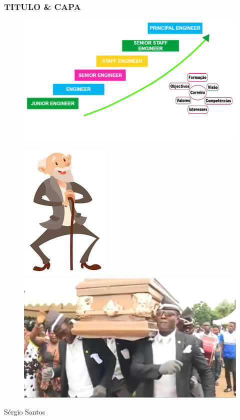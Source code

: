 \begin{frame}
\frametitle{TITULO \& CAPA}
\begin{minipage}{.5\linewidth}
\begin{figure}[ht]
\begin{flushleft}
\includegraphics[scale=0.35]{./image/CORGA/Career_Path/Progressao.png}
\end{flushleft}
\end{figure}
\end{minipage}
\begin{minipage}{.45\linewidth}
\begin{figure}[ht]
	\begin{flushleft}
		\includegraphics[scale=0.25]{./image/CORGA/Career_Path/Old_Age.jpeg}
	\end{flushleft}\vfill
	\begin{flushright}
		\includegraphics[scale=0.1]{./image/CORGA/Career_Path/Burial.jpeg}
	\end{flushright}
\end{figure}
\end{minipage}
\vfill
\hfill {\tiny Sérgio Santos}
\end{frame}
